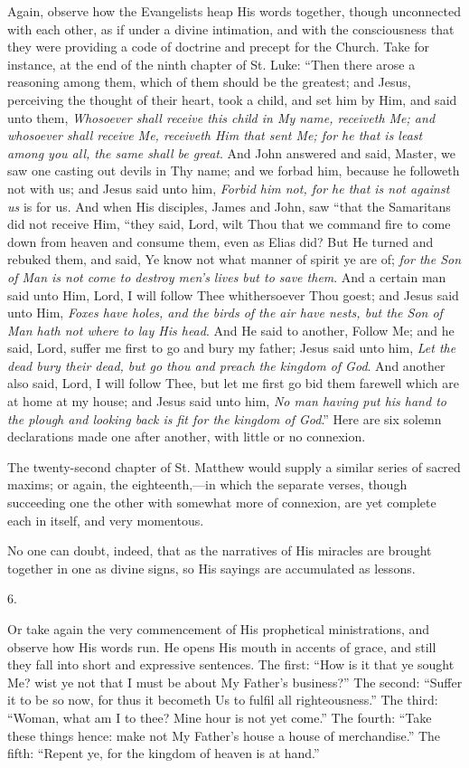 Again, observe how the Evangelists heap His words together, though
unconnected with each other, as if under a divine intimation, and with
the consciousness that they were providing a code of doctrine and
precept for the Church. Take for instance, at the end of the ninth
chapter of St. Luke: ``Then there arose a reasoning among them,
which of them should be the greatest; and Jesus, perceiving the
thought of their heart, took a child, and set him by Him, and said
unto them, \emph{Whosoever shall receive this child in My name, receiveth
Me; and whosoever shall receive Me, receiveth Him that sent Me; for he
that is least among you all, the same shall be great}. And John
answered and said, Master, we saw one casting out devils in Thy name;
and we forbad him, because he followeth not with us; and Jesus
said unto him, \emph{Forbid him not, for he that is not against us} is
for us. And when His disciples, James and John, saw ``that the
Samaritans did not receive Him, ``they said, Lord, wilt Thou that
we command fire to come down from heaven and consume them, even as
Elias did? But He turned and rebuked them, and said, Ye know not what
manner of spirit ye are of; \emph{for the Son of Man is not come to
destroy men's lives but to save them}. And a certain man said unto
Him, Lord, I will follow Thee whithersoever Thou goest; and Jesus said
unto Him, \emph{Foxes have holes, and the birds of the air have nests,
but the Son of Man hath not where to lay His head}. And He said to
another, Follow Me; and he said, Lord, suffer me first to go and bury
my father; Jesus said unto him, \emph{Let the dead bury their dead, but
go thou and preach the kingdom of God}. And another also said,
Lord, I will follow Thee, but let me first go bid them farewell which
are at home at my house; and Jesus said unto him, \emph{No man having put
his hand to the plough and looking back is fit for the kingdom of God}.''
Here are six solemn declarations made one after another, with little
or no connexion.

The twenty-second chapter of St. Matthew would supply a similar
series of sacred maxims; or again, the eighteenth,—in which the
separate verses, though succeeding one the other with somewhat more of
connexion, are yet complete each in itself, and very momentous.

No one can doubt, indeed, that as the narratives of His miracles
are brought together in one as divine signs, so His sayings are
accumulated as lessons.

6.

Or take again the very commencement of His prophetical
ministrations, and observe how His words run. He opens His mouth in
accents of grace, and still they fall into short and expressive
sentences. The first: ``How is it that ye sought Me? wist ye
not that I must be about My Father's business?'' The second:
``Suffer it to be so now, for thus it becometh Us to fulfil all
righteousness.'' The third: ``Woman, what am I to thee? Mine
hour is not yet come.'' The fourth: ``Take these things hence:
make not My Father's house a house of merchandise.'' The fifth:
``Repent ye, for the kingdom of heaven is at hand.''

